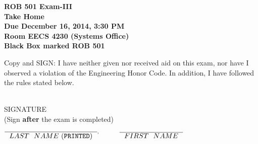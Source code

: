 \documentclass[letterpaper]{article}
\newcommand{\bline}[1]{\underline{\hspace*{#1}}}
\begin{document}



\vspace*{.1in}
\begin{center}
\LARGE \bf
ROB 501 Exam-III \\
Take Home \\
\large
Due December 16, 2014, 3:30 PM \\
Room EECS 4230 (Systems Office)\\
Black Box marked ROB 501
\end{center}

\vspace*{1in}

 Copy and SIGN: I have neither given nor received aid on this exam, nor have I observed a violation of the
Engineering Honor Code. In addition, I have followed the rules stated below.

\vspace*{1in}
\begin{flushright}
\underline{\hspace*{2.5in}} \\
SIGNATURE \\
(Sign {\bf after} the exam is completed)
\end{flushright}

\vspace*{1in}

\begin{center}
$\overline{\mathrm ~~LAST~~NAME~ ({\tt PRINTED})~~}^, \hspace*{.4in} \overline{\mathrm ~~FIRST~~NAME~~}$ \\

\end{center}
\end{document}
